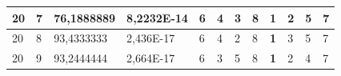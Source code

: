 \documentclass[conference]{IEEEtran}
\begin{document}
\begin{table}[]
\begin{tabular}{|llll|llllllll|}
\multicolumn{1}{|l|}{20}                                                    & \multicolumn{1}{l|}{7}                                                        & \multicolumn{1}{l|}{76,1888889}                                                   & 8,2232E-14                     & \multicolumn{1}{l|}{6}                                                  & \multicolumn{1}{l|}{4}                                                  & \multicolumn{1}{l|}{3}                                                  & \multicolumn{1}{l|}{8}                                                  & \multicolumn{1}{l|}{\textbf{1}}                                         & \multicolumn{1}{l|}{2}                                                  & \multicolumn{1}{l|}{5}                                                  & 7                          \\ \hline
\multicolumn{1}{|l|}{20}                                                    & \multicolumn{1}{l|}{8}                                                        & \multicolumn{1}{l|}{93,4333333}                                                   & 2,436E-17                      & \multicolumn{1}{l|}{6}                                                  & \multicolumn{1}{l|}{4}                                                  & \multicolumn{1}{l|}{2}                                                  & \multicolumn{1}{l|}{8}                                                  & \multicolumn{1}{l|}{\textbf{1}}                                         & \multicolumn{1}{l|}{3}                                                  & \multicolumn{1}{l|}{5}                                                  & 7                          \\ \hline
\multicolumn{1}{|l|}{20}                                                    & \multicolumn{1}{l|}{9}                                                        & \multicolumn{1}{l|}{93,2444444}                                                   & 2,664E-17                      & \multicolumn{1}{l|}{6}                                                  & \multicolumn{1}{l|}{3}                                                  & \multicolumn{1}{l|}{5}                                                  & \multicolumn{1}{l|}{8}                                                  & \multicolumn{1}{l|}{\textbf{1}}                                         & \multicolumn{1}{l|}{2}                                                  & \multicolumn{1}{l|}{4}                                                  & 7                          \\ \hline
\end{tabular}
\end{table}
\end{document}
